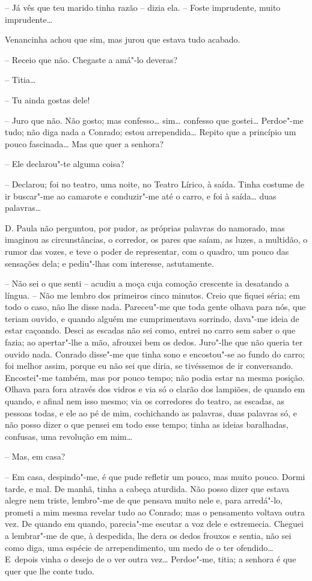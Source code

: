 -- Já vês que teu marido tinha razão -- dizia ela. -- Foste imprudente,
muito imprudente\ldots{}

Venancinha achou que sim, mas jurou que estava tudo acabado.

-- Receio que não. Chegaste a amá"-lo deveras?

-- Titia\ldots{}

-- Tu ainda gostas dele!

-- Juro que não. Não gosto; mas confesso\ldots{} sim\ldots{} confesso que
gostei\ldots{} Perdoe"-me tudo; não diga nada a Conrado; estou arrependida\ldots{} Repito que
a princípio um pouco fascinada\ldots{} Mas que quer a senhora?

-- Ele declarou"-te alguma coisa?

-- Declarou; foi no teatro, uma noite, no Teatro Lírico, à saída. Tinha
costume de ir buscar"-me ao camarote e conduzir"-me até o carro, e foi à
saída\ldots{} duas palavras\ldots{}

D. Paula não perguntou, por pudor, as próprias palavras do namorado, mas
imaginou as circunstâncias, o corredor, os pares que saíam, as luzes, a
multidão, o rumor das vozes, e teve o poder de representar, com o
quadro, um pouco das sensações dela; e pediu"-lhas com interesse,
astutamente.

-- Não sei o que senti -- acudiu a moça cuja comoção crescente ia
desatando a língua. -- Não me lembro dos primeiros cinco minutos. Creio
que fiquei séria; em todo o caso, não lhe disse nada. Pareceu"-me que
toda gente olhava para nós, que teriam ouvido, e quando alguém me
cumprimentava sorrindo, dava"-me ideia de estar caçoando. Desci as
escadas não sei como, entrei no carro sem saber o que fazia; ao
apertar"-lhe a mão, afrouxei bem os dedos. Juro"-lhe que não queria ter
ouvido nada. Conrado disse"-me que tinha sono e encostou"-se ao fundo do
carro; foi melhor assim, porque eu não sei que diria, se tivéssemos de
ir conversando. Encostei"-me também, mas por pouco tempo; não podia estar
na mesma posição. Olhava para fora através dos vidros e via só o clarão
dos lampiões, de quando em quando, e afinal nem isso mesmo; via os
corredores do teatro, as escadas, as pessoas todas, e ele ao pé de mim,
cochichando as palavras, duas palavras só, e não posso dizer o que
pensei em todo esse tempo; tinha as ideias baralhadas, confusas, uma
revolução em mim\ldots{}

-- Mas, em casa?

-- Em casa, despindo"-me, é que pude refletir um pouco, mas muito pouco.
Dormi tarde, e mal. De manhã, tinha a cabeça aturdida. Não posso dizer
que estava alegre nem triste, lembro"-me de que pensava muito nele e,
para arredá"-lo, prometi a mim mesma revelar tudo ao Conrado; mas o
pensamento voltava outra vez. De quando em quando, parecia"-me escutar a
voz dele e estremecia. Cheguei a lembrar"-me de que, à despedida, lhe
dera os dedos frouxos e sentia, não sei como diga, uma espécie de
arrependimento, um medo de o ter ofendido\ldots{} E~depois vinha o desejo de
o ver outra vez\ldots{} Perdoe"-me, titia; a senhora é que quer que lhe conte
tudo.

